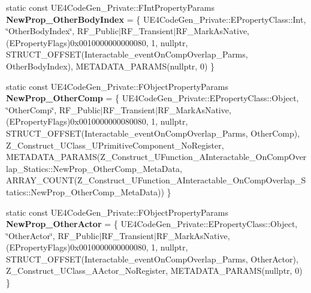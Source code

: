 \begin{DoxyCompactItemize}
static const U\+E4\+Code\+Gen\+\_\+\+Private\+::\+F\+Int\+Property\+Params {\bfseries New\+Prop\+\_\+\+Other\+Body\+Index} = \{ U\+E4\+Code\+Gen\+\_\+\+Private\+::\+E\+Property\+Class\+::\+Int, \char`\"{}Other\+Body\+Index\char`\"{}, R\+F\+\_\+\+Public$\vert$R\+F\+\_\+\+Transient$\vert$R\+F\+\_\+\+Mark\+As\+Native, (E\+Property\+Flags)0x0010000000000080, 1, nullptr, S\+T\+R\+U\+C\+T\+\_\+\+O\+F\+F\+S\+E\+T(\+Interactable\+\_\+event\+On\+Comp\+Overlap\+\_\+\+Parms, Other\+Body\+Index), M\+E\+T\+A\+D\+A\+T\+A\+\_\+\+P\+A\+R\+A\+M\+S(nullptr, 0) \}
\item 
\mbox{\label{struct_z___construct___u_function___a_interactable___on_comp_overlap___statics_a24ba1c01dbd81e894335e49b6c4a17ce}} 
static const U\+E4\+Code\+Gen\+\_\+\+Private\+::\+F\+Object\+Property\+Params {\bfseries New\+Prop\+\_\+\+Other\+Comp} = \{ U\+E4\+Code\+Gen\+\_\+\+Private\+::\+E\+Property\+Class\+::\+Object, \char`\"{}Other\+Comp\char`\"{}, R\+F\+\_\+\+Public$\vert$R\+F\+\_\+\+Transient$\vert$R\+F\+\_\+\+Mark\+As\+Native, (E\+Property\+Flags)0x0010000000080080, 1, nullptr, S\+T\+R\+U\+C\+T\+\_\+\+O\+F\+F\+S\+E\+T(\+Interactable\+\_\+event\+On\+Comp\+Overlap\+\_\+\+Parms, Other\+Comp), Z\+\_\+\+Construct\+\_\+\+U\+Class\+\_\+\+U\+Primitive\+Component\+\_\+\+No\+Register, M\+E\+T\+A\+D\+A\+T\+A\+\_\+\+P\+A\+R\+A\+M\+S(\+Z\+\_\+\+Construct\+\_\+\+U\+Function\+\_\+\+A\+Interactable\+\_\+\+On\+Comp\+Overlap\+\_\+\+Statics\+::\+New\+Prop\+\_\+\+Other\+Comp\+\_\+\+Meta\+Data, A\+R\+R\+A\+Y\+\_\+\+C\+O\+U\+N\+T(\+Z\+\_\+\+Construct\+\_\+\+U\+Function\+\_\+\+A\+Interactable\+\_\+\+On\+Comp\+Overlap\+\_\+\+Statics\+::\+New\+Prop\+\_\+\+Other\+Comp\+\_\+\+Meta\+Data)) \}
\item 
\mbox{\label{struct_z___construct___u_function___a_interactable___on_comp_overlap___statics_a5df8ed5753ec9565bdcf321f4bb9aa36}} 
static const U\+E4\+Code\+Gen\+\_\+\+Private\+::\+F\+Object\+Property\+Params {\bfseries New\+Prop\+\_\+\+Other\+Actor} = \{ U\+E4\+Code\+Gen\+\_\+\+Private\+::\+E\+Property\+Class\+::\+Object, \char`\"{}Other\+Actor\char`\"{}, R\+F\+\_\+\+Public$\vert$R\+F\+\_\+\+Transient$\vert$R\+F\+\_\+\+Mark\+As\+Native, (E\+Property\+Flags)0x0010000000000080, 1, nullptr, S\+T\+R\+U\+C\+T\+\_\+\+O\+F\+F\+S\+E\+T(\+Interactable\+\_\+event\+On\+Comp\+Overlap\+\_\+\+Parms, Other\+Actor), Z\+\_\+\+Construct\+\_\+\+U\+Class\+\_\+\+A\+Actor\+\_\+\+No\+Register, M\+E\+T\+A\+D\+A\+T\+A\+\_\+\+P\+A\+R\+A\+M\+S(nullptr, 0) \}

\end{DoxyCompactItemize}

